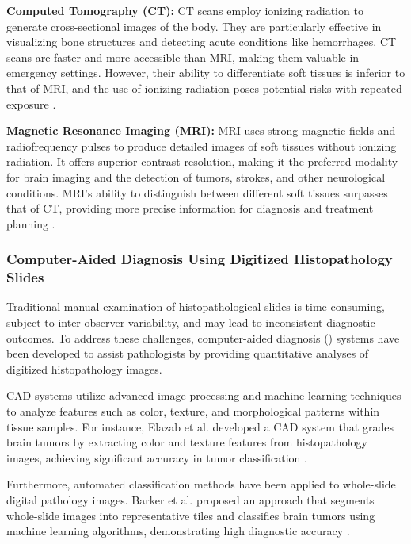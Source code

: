 \textbf{Computed Tomography (CT):} CT scans employ ionizing radiation to generate cross-sectional images of the body. They are particularly effective in visualizing bone structures and detecting acute conditions like hemorrhages. CT scans are faster and more accessible than MRI, making them valuable in emergency settings. However, their ability to differentiate soft tissues is inferior to that of MRI, and the use of ionizing radiation poses potential risks with repeated exposure \cite{healthimages2019ct}.

\textbf{Magnetic Resonance Imaging (MRI):} MRI uses strong magnetic fields and radiofrequency pulses to produce detailed images of soft tissues without ionizing radiation. It offers superior contrast resolution, making it the preferred modality for brain imaging and the detection of tumors, strokes, and other neurological conditions. MRI's ability to distinguish between different soft tissues surpasses that of CT, providing more precise information for diagnosis and treatment planning \cite{healthimages2019mri}.

\subsubsection{Computer-Aided Diagnosis Using Digitized Histopathology Slides}

Traditional manual examination of histopathological slides is time-consuming, subject to inter-observer variability, and may lead to inconsistent diagnostic outcomes. To address these challenges, computer-aided diagnosis () systems have been developed to assist pathologists by providing quantitative analyses of digitized histopathology images.

CAD systems utilize advanced image processing and machine learning techniques to analyze features such as color, texture, and morphological patterns within tissue samples. For instance, Elazab et al. developed a CAD system that grades brain tumors by extracting color and texture features from histopathology images, achieving significant accuracy in tumor classification \cite{elazab2024computer}.

Furthermore, automated classification methods have been applied to whole-slide digital pathology images. Barker et al. proposed an approach that segments whole-slide images into representative tiles and classifies brain tumors using machine learning algorithms, demonstrating high diagnostic accuracy \cite{barker2016automated}.


